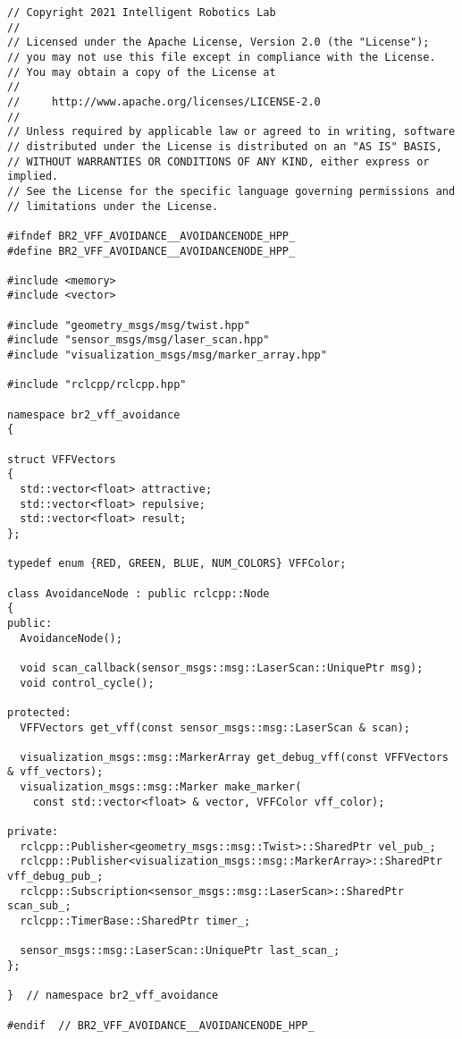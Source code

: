  \footnotesize
\begin{tcolorbox}[sharp corners, colframe=gray!80, colback=LightGray, left=0pt, top=0pt, bottom=0pt, title=\texttt{br2\_vff\_avoidance/include/br2\_vff\_avoidance/AvoidanceNode.hpp}]
  \begin{verbatim}
// Copyright 2021 Intelligent Robotics Lab
//
// Licensed under the Apache License, Version 2.0 (the "License");
// you may not use this file except in compliance with the License.
// You may obtain a copy of the License at
//
//     http://www.apache.org/licenses/LICENSE-2.0
//
// Unless required by applicable law or agreed to in writing, software
// distributed under the License is distributed on an "AS IS" BASIS,
// WITHOUT WARRANTIES OR CONDITIONS OF ANY KIND, either express or implied.
// See the License for the specific language governing permissions and
// limitations under the License.

#ifndef BR2_VFF_AVOIDANCE__AVOIDANCENODE_HPP_
#define BR2_VFF_AVOIDANCE__AVOIDANCENODE_HPP_

#include <memory>
#include <vector>

#include "geometry_msgs/msg/twist.hpp"
#include "sensor_msgs/msg/laser_scan.hpp"
#include "visualization_msgs/msg/marker_array.hpp"

#include "rclcpp/rclcpp.hpp"

namespace br2_vff_avoidance
{

struct VFFVectors
{
  std::vector<float> attractive;
  std::vector<float> repulsive;
  std::vector<float> result;
};

typedef enum {RED, GREEN, BLUE, NUM_COLORS} VFFColor;

class AvoidanceNode : public rclcpp::Node
{
public:
  AvoidanceNode();

  void scan_callback(sensor_msgs::msg::LaserScan::UniquePtr msg);
  void control_cycle();

protected:
  VFFVectors get_vff(const sensor_msgs::msg::LaserScan & scan);

  visualization_msgs::msg::MarkerArray get_debug_vff(const VFFVectors & vff_vectors);
  visualization_msgs::msg::Marker make_marker(
    const std::vector<float> & vector, VFFColor vff_color);

private:
  rclcpp::Publisher<geometry_msgs::msg::Twist>::SharedPtr vel_pub_;
  rclcpp::Publisher<visualization_msgs::msg::MarkerArray>::SharedPtr vff_debug_pub_;
  rclcpp::Subscription<sensor_msgs::msg::LaserScan>::SharedPtr scan_sub_;
  rclcpp::TimerBase::SharedPtr timer_;

  sensor_msgs::msg::LaserScan::UniquePtr last_scan_;
};

}  // namespace br2_vff_avoidance

#endif  // BR2_VFF_AVOIDANCE__AVOIDANCENODE_HPP_
    \end{verbatim}
    \end{tcolorbox}
  \normalsize

